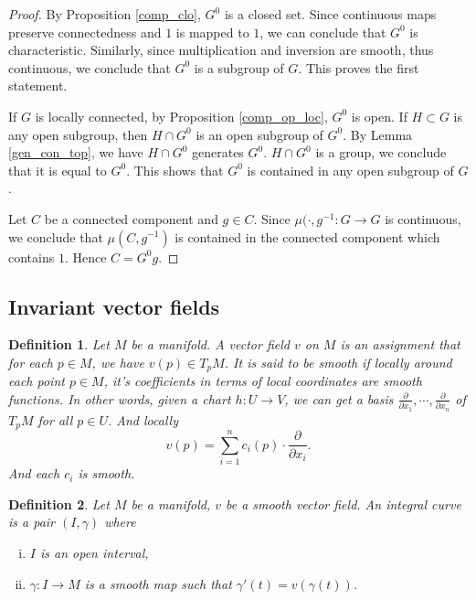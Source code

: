 \documentclass{article}
\newtheorem{definition}{Definition}[section]
\numberwithin{equation}{section}
\begin{document}
\begin{proof}
By Proposition \ref{comp_clo}, $G^0$ is a closed set. Since continuous maps preserve connectedness and $1$ is mapped to $1$, we can conclude that $G^0$ is characteristic. Similarly, since multiplication and inversion are smooth, thus continuous, we conclude that $G^0$ is a subgroup of $G$. This proves the first statement.\\
\par If $G$ is locally connected, by Proposition \ref{comp_op_loc}, $G^0$ is open. If $H\subset G$ is any open subgroup, then $H\cap G^0$ is an open subgroup of $G^0$. By Lemma \ref{gen_con_top}, we have $H\cap G^0$ generates $G^0$. $H\cap G^0$ is a group, we conclude that it is equal to $G^0$. This shows that $G^0$ is contained in any open subgroup of $G$.\\
\par Let $C$ be a connected component and $g\in C$. Since $\mu(\cdot,g^{-1}:G\to G$ is continuous, we conclude that $\mu(C,g^{-1})$ is contained in the connected component which contains $1$. Hence $C=G^0g$.
\end{proof}

\subsection{Invariant vector fields}

\begin{definition}
Let $M$ be a manifold. A vector field $v$ on $M$ is an assignment that for each $p\in M$, we have $v(p)\in T_pM$. It is said to be smooth if locally around each point $p\in M$, it's coefficients in terms of local coordinates are smooth functions. In other words, given a chart $h:U\to V$, we can get a basis ${\frac \partial {\partial x_1}},\cdots,{\frac \partial {\partial x_n}}$ of $T_pM$ for all $p\in U$. And locally
\begin{equation*}
v(p) = \sum_{i=1}^n c_i(p)\cdot{\frac \partial {\partial x_i}}.
\end{equation*}
And each $c_i$ is smooth.
\end{definition}

\begin{definition}
Let $M$ be a manifold, $v$ be a smooth vector field. An integral curve is a pair $(I,\gamma)$ where
\begin{enumerate}[i).]
\item $I$ is an open interval,
\item $\gamma:I\to M$ is a smooth map such that $\gamma'(t) = v(\gamma(t))$.
\end{enumerate}
\end{definition}
\end{document}
